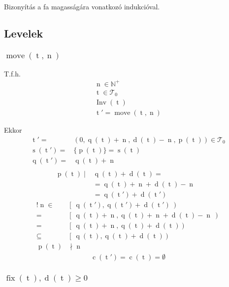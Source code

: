 \documentclass{article}
\newcommand*{\NaturalsP}{\ensuremath{\mathbb{N}^+}}
\newcommand*{\Trees}{\ensuremath{\mathcal{T}}}
\newcommand*{\fFix}{\ensuremath{\operatorname{fix}}}
\newcommand*{\fInv}{\ensuremath{\operatorname{Inv}}}
\newcommand*{\fMove}{\ensuremath{\operatorname{move}}}
\newcommand*{\sChildren}[1]{\ensuremath{\operatorname{c}\left(#1\right)}}
\newcommand*{\sDiff}[1]{\ensuremath{\operatorname{d}\left(#1\right)}}
\newcommand*{\sPosition}[1]{\ensuremath{\operatorname{q}\left(#1\right)}}
\newcommand*{\sPrime}[1]{\ensuremath{\operatorname{p}\left(#1\right)}}
\newcommand*{\sPrimes}[1]{\ensuremath{\operatorname{s}\left(#1\right)}}
\newcommand*{\vN}{\ensuremath{\operatorname{n}}}
\newcommand*{\vT}{\ensuremath{\operatorname{t}}}
\begin{document}
Bizonyítás a fa magasságára vonatkozó indukcióval.

\subsection{Levelek}

\subsubsection{$ \fMove(\vT, \vN) $}

T.f.h.
\begin{align*}
\vN \in \NaturalsP \\
\vT \in \Trees_0 \\
\fInv(\vT) \\
\vT' = \fMove(\vT, \vN)
\end{align*}

Ekkor
\begin{align*}
\vT' =& (0, \sPosition{\vT} + \vN, \sDiff{\vT} - \vN, \sPrime{\vT})
	\in \Trees_0 \tag{M1} \\
\sPrimes{\vT'} =& \{ \sPrime{\vT} \} = \sPrimes{\vT} \tag{M2} \\
\sPosition{\vT'} =& \sPosition{\vT} + \vN \tag{M3} \\
\end{align*}
\begin{align*}
\sPrime{\vT} \mid & \sPosition{\vT} + \sDiff{\vT} = \\
	& = \sPosition{\vT} + \vN + \sDiff{\vT} - \vN & \\
	& = \sPosition{\vT'} + \sDiff{\vT'} \tag{I1}
\end{align*}
\begin{align*}
! \vN \in& \left[\ \sPosition{\vT'} , \sPosition{\vT'} + \sDiff{\vT'}\ \right) \\
=& \left[\ \sPosition{\vT} + \vN , \sPosition{\vT} + \vN + \sDiff{\vT} - \vN\ \right) \\
=& \left[\ \sPosition{\vT} + \vN , \sPosition{\vT} + \sDiff{\vT} \right) \\
\subseteq&  \left[\ \sPosition{\vT} , \sPosition{\vT} + \sDiff{\vT} \right) \\
\sPrime{\vT} &\nmid \vN \tag{I2}
\end{align*}
\begin{align*}
\sChildren{\vT'} = \sChildren{\vT} = \emptyset \tag{I3, I4, M4}
\end{align*}

\subsubsection{$ \fFix(\vT), \sDiff{\vT} \ge 0 $ }
\end{document}
